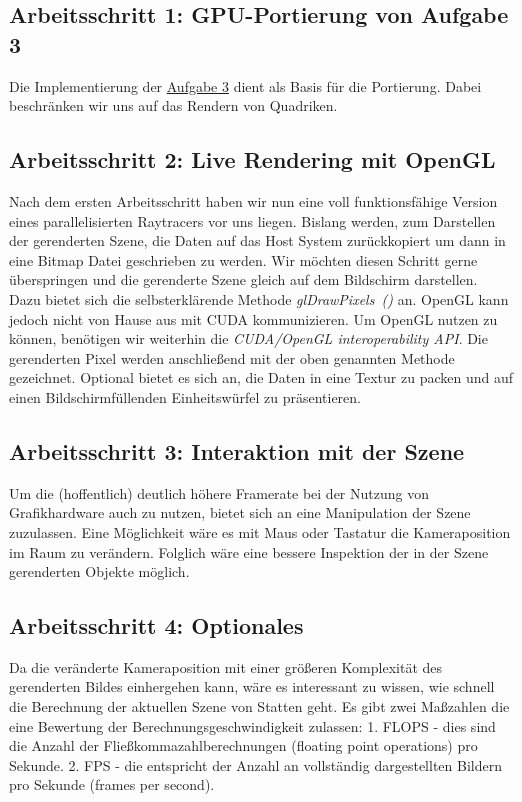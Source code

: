 \documentclass[10pt]{article}
\begin{document}
\begin{multicols}{2}
\subsection{Arbeitsschritt 1: GPU-Portierung von Aufgabe 3}
Die Implementierung der \href{https://github.com/plattenschieber/HSCGV_Uebungen/tree/master/hscgv_uebung_3}{Aufgabe 3} dient als Basis für die Portierung. Dabei beschränken wir uns auf das Rendern von Quadriken. 

\subsection{Arbeitsschritt 2: Live Rendering mit OpenGL}
Nach dem ersten Arbeitsschritt haben wir nun eine voll funktionsfähige Version eines parallelisierten Raytracers vor uns liegen. Bislang werden, zum Darstellen der gerenderten Szene, die Daten auf das Host System zurückkopiert um dann in eine Bitmap Datei geschrieben zu werden.
Wir möchten diesen Schritt gerne überspringen und die gerenderte Szene gleich auf dem Bildschirm darstellen. Dazu bietet sich die selbsterklärende Methode \textit{glDrawPixels~()} an. OpenGL kann jedoch nicht von Hause aus mit CUDA kommunizieren. Um OpenGL nutzen zu können, benötigen wir weiterhin die \textit{CUDA/OpenGL interoperability API}. Die gerenderten Pixel werden anschließend mit der oben genannten Methode gezeichnet. Optional bietet es sich an, die Daten in eine Textur zu packen und auf einen Bildschirmfüllenden Einheitswürfel zu präsentieren. 

\subsection{Arbeitsschritt 3: Interaktion mit der Szene}
Um die (hoffentlich) deutlich höhere Framerate bei der Nutzung von Grafikhardware auch zu nutzen, bietet sich an eine Manipulation der Szene zuzulassen. Eine Möglichkeit wäre es mit Maus oder Tastatur die Kameraposition im Raum zu verändern. Folglich wäre eine bessere Inspektion der in der Szene gerenderten Objekte möglich. 

\subsection{Arbeitsschritt 4: Optionales}
Da die veränderte Kameraposition mit einer größeren Komplexität des gerenderten Bildes einhergehen kann, wäre es interessant zu wissen, wie schnell die Berechnung der aktuellen Szene von Statten geht. Es gibt zwei Maßzahlen die eine Bewertung der Berechnungsgeschwindigkeit zulassen: 
1. FLOPS - dies sind die Anzahl der Fließkommazahlberechnungen (floating point operations) pro Sekunde. 
2. FPS - die entspricht der Anzahl an vollständig dargestellten Bildern pro Sekunde (frames per second).



\end{multicols}
\end{document}
